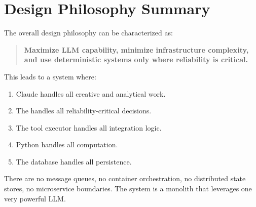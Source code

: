 \section{Design Philosophy Summary}
\label{sec:patterns:philosophy}

The overall design philosophy can be characterized as:

\begin{quote}
\textbf{Maximize LLM capability, minimize infrastructure complexity, and use deterministic systems only where reliability is critical.}
\end{quote}

This leads to a system where:
\begin{enumerate}
  \item Claude handles all creative and analytical work.
  \item The \governor handles all reliability-critical decisions.
  \item The tool executor handles all integration logic.
  \item Python handles all computation.
  \item The database handles all persistence.
\end{enumerate}

There are no message queues, no container orchestration, no distributed state stores, no microservice boundaries.
The system is a monolith that leverages one very powerful LLM.
